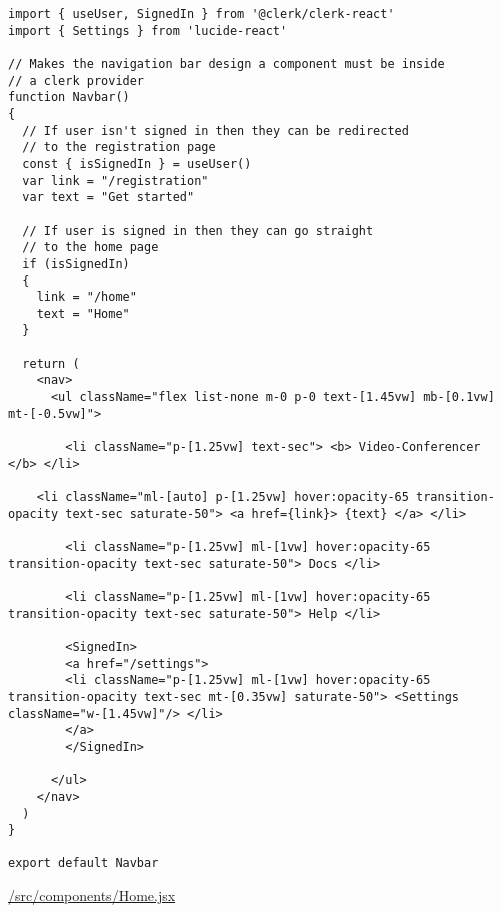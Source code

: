 \begin{verbatim}
import { useUser, SignedIn } from '@clerk/clerk-react'
import { Settings } from 'lucide-react'

// Makes the navigation bar design a component must be inside
// a clerk provider
function Navbar()
{
  // If user isn't signed in then they can be redirected
  // to the registration page
  const { isSignedIn } = useUser()
  var link = "/registration"
  var text = "Get started"

  // If user is signed in then they can go straight
  // to the home page
  if (isSignedIn)
  {
    link = "/home"
    text = "Home"
  }

  return (
    <nav>
      <ul className="flex list-none m-0 p-0 text-[1.45vw] mb-[0.1vw] mt-[-0.5vw]">

        <li className="p-[1.25vw] text-sec"> <b> Video-Conferencer </b> </li>

	<li className="ml-[auto] p-[1.25vw] hover:opacity-65 transition-opacity text-sec saturate-50"> <a href={link}> {text} </a> </li>

        <li className="p-[1.25vw] ml-[1vw] hover:opacity-65 transition-opacity text-sec saturate-50"> Docs </li>

        <li className="p-[1.25vw] ml-[1vw] hover:opacity-65 transition-opacity text-sec saturate-50"> Help </li>

        <SignedIn>
        <a href="/settings">
        <li className="p-[1.25vw] ml-[1vw] hover:opacity-65 transition-opacity text-sec mt-[0.35vw] saturate-50"> <Settings className="w-[1.45vw]"/> </li>
        </a>
        </SignedIn>

      </ul>
    </nav>
  )
}

export default Navbar
\end{verbatim}

\underline{/src/components/Home.jsx}

